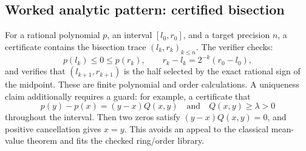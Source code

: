 \subsection{Worked analytic pattern: certified bisection}

For a rational polynomial \(p\), an interval \([l_0,r_0]\), and a target
precision \(n\), a certificate contains the bisection trace
\((l_k,r_k)_{k\le n}\).  The verifier checks:
\[
 p(l_k)\le0\le p(r_k),\qquad
 r_k-l_k=2^{-k}(r_0-l_0),
\]
and verifies that \((l_{k+1},r_{k+1})\) is the half selected by the exact
rational sign of the midpoint.  These are finite polynomial and order
calculations.  A uniqueness claim additionally requires a guard: for example,
a certificate that
\[
 p(y)-p(x)=(y-x)Q(x,y)
 \quad\text{and}\quad Q(x,y)\ge\lambda>0
\]
throughout the interval.  Then two zeros satisfy
\((y-x)Q(x,y)=0\), and positive cancellation gives \(x=y\).  This avoids an
appeal to the classical mean-value theorem and fits the checked ring/order
library.
